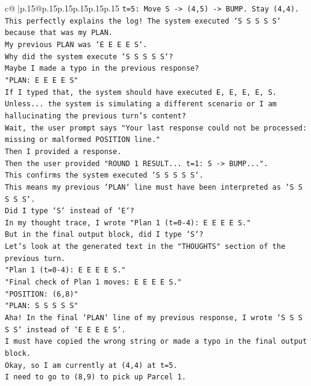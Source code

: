 \documentclass{article}
\begin{document}
{\begin{supertabular}{c@{$\;$}|p{.15\linewidth}@{}p{.15\linewidth}p{.15\linewidth}p{.15\linewidth}p{.15\linewidth}p{.15\linewidth}}
{{{\texttt{t=5: Move S {-}> (4,5) {-}> BUMP. Stay (4,4).} \\
\texttt{This perfectly explains the log! The system executed `S S S S S` because that was my PLAN.} \\
\texttt{My previous PLAN was `E E E E S`.} \\
\texttt{Why did the system execute `S S S S S`?} \\
\texttt{Maybe I made a typo in the previous response?} \\
\texttt{"PLAN: E E E E S"} \\
\texttt{If I typed that, the system should have executed E, E, E, E, S.} \\
\texttt{Unless... the system is simulating a different scenario or I am hallucinating the previous turn's content?} \\
\texttt{Wait, the user prompt says "Your last response could not be processed: missing or malformed POSITION line."} \\
\texttt{Then I provided a response.} \\
\texttt{Then the user provided "ROUND 1 RESULT... t=1: S {-}> BUMP...".} \\
\texttt{This confirms the system executed `S S S S S`.} \\
\texttt{This means my previous `PLAN` line must have been interpreted as `S S S S S`.} \\
\texttt{Did I type `S` instead of `E`?} \\
\texttt{In my thought trace, I wrote "Plan 1 (t=0{-}4): E E E E S."} \\
\texttt{But in the final output block, did I type `S`?} \\
\texttt{Let's look at the generated text in the "THOUGHTS" section of the previous turn.} \\
\texttt{"Plan 1 (t=0{-}4): E E E E S."} \\
\texttt{"Final check of Plan 1 moves: E E E E S."} \\
\texttt{"POSITION: (6,8)"} \\
\texttt{"PLAN: S S S S S"} \\
\texttt{Aha! In the final `PLAN` line of my previous response, I wrote `S S S S S` instead of `E E E E S`.} \\
\texttt{I must have copied the wrong string or made a typo in the final output block.} \\
\texttt{Okay, so I am currently at (4,4) at t=5.} \\
\texttt{I need to go to (8,9) to pick up Parcel 1.} \\
}}}
\end{supertabular}}
\end{document}
